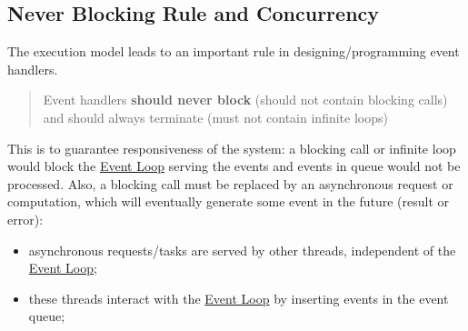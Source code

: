 \subsection{Never Blocking Rule and Concurrency}\label{sub:rs_never_blocking_rule_and_concurrency} %
The execution model leads to an important rule in designing/programming event handlers.
\begin{quote}
    Event handlers \textbf{should never block} (should not contain blocking calls) and should always terminate (must not contain infinite loops)
\end{quote}
This is to guarantee responsiveness of the system: a blocking call or infinite loop would block the \hyperref[sec:rs_event_loop]{Event Loop} serving the events and events in queue would not be processed.
Also, a blocking call must be replaced by an asynchronous request or computation, which will eventually generate some event in the future (result or error):
\begin{itemize}
    \item asynchronous requests/tasks are served by other threads, independent of the \hyperref[sec:rs_event_loop]{Event Loop};
    \item these threads interact with the \hyperref[sec:rs_event_loop]{Event Loop} by inserting events in the event queue;
\end{itemize}
%
